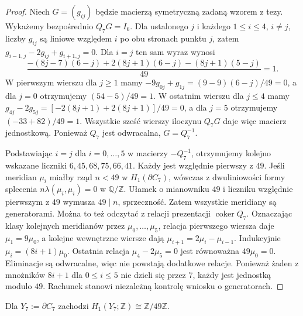 \begin{proof}
Niech $G=(g_{ij})$ będzie macierzą symetryczną
zadaną wzorem z tezy. Wykażemy bezpośrednio
$Q_7G=I_6$. Dla ustalonego $j$ i każdego
$1\le i\le4$, $i\ne j$, liczby $g_{ij}$
są liniowe względem $i$ po obu stronach
punktu $j$, zatem
$g_{i-1,j}-2g_{ij}+g_{i+1,j}=0$.
Dla $i=j$ ten sam wyraz wynosi
\[
\frac{-(8j-7)(6-j)+2(8j+1)(6-j)
-(8j+1)(5-j)}{49}=1.
\]
W pierwszym wierszu dla $j\geq1$
mamy $-9g_{0j}+g_{1j}=(9-9)(6-j)/49=0$,
a dla $j=0$ otrzymujemy $(54-5)/49=1$.
W ostatnim wierszu dla $j\leq4$ mamy
$g_{4j}-2g_{5j}=[-2(8j+1)+2(8j+1)]/49=0$,
a dla $j=5$ otrzymujemy $(-33+82)/49=1$.
Wszystkie sześć wierszy iloczynu
$Q_7G$ daje więc macierz jednostkową.
Ponieważ $Q_7$ jest odwracalna,
$G=Q_7^{-1}$.

Podstawiając $i=j$ dla $i=0,\ldots,5$ w macierzy
$-Q_7^{-1}$, otrzymujemy kolejno wskazane liczniki
$6,45,68,75,66,41$. Każdy jest
względnie pierwszy z $49$.
Jeśli meridian $\mu_i$ miałby rząd
$n<49$ w $H_1(\partial C_7)$,
wówczas z dwuliniowości formy splecenia
$n\lambda(\mu_i,\mu_i)=0$ w
$\mathbb Q/\mathbb Z$. Ułamek o
mianowniku $49$ i liczniku
względnie pierwszym z $49$
wymusza $49\mid n$, sprzeczność.
Zatem wszystkie meridiany są generatorami.
Można to też odczytać z relacji prezentacji
$\operatorname{coker}Q_7$. Oznaczając klasy
kolejnych meridianów przez $\mu_0,\ldots,\mu_5$,
relacja pierwszego wiersza daje $\mu_1=9\mu_0$,
a kolejne wewnętrzne wiersze dają
$\mu_{i+1}=2\mu_i-\mu_{i-1}$.
Indukcyjnie $\mu_i=(8i+1)\mu_0$.
Ostatnia relacja $\mu_4-2\mu_5=0$
jest równoważna $49\mu_0=0$.
Eliminacje są odwracalne, więc nie powstają
dodatkowe relacje. Ponieważ żaden z mnożników
$8i+1$ dla $0\le i\le5$ nie dzieli się przez $7$,
każdy jest jednostką modulo $49$.
Rachunek stanowi niezależną kontrolę wniosku
o generatorach.
\end{proof}

\begin{stwierdzenie}
\label{prop:tg-park-h1-boundary}
Dla $Y_7:=\partial C_7$ zachodzi
$H_1(Y_7;\mathbb Z)\cong\mathbb Z/49\mathbb Z$.
\end{stwierdzenie}

